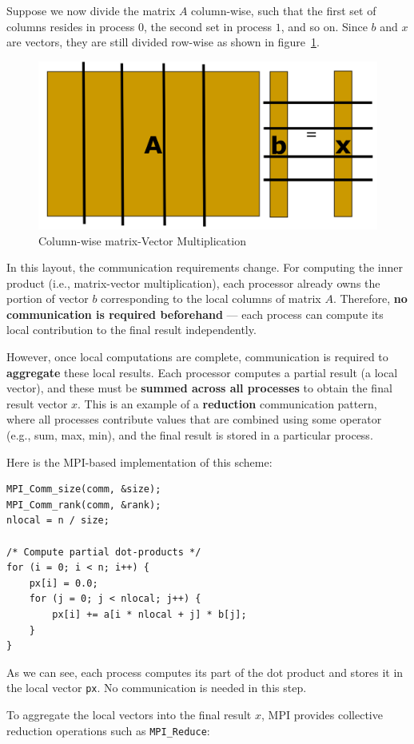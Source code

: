 \documentclass[12pt]{book}
\begin{document}
Suppose we now divide the matrix $A$ column-wise, such that the first set of columns resides in process $0$, the second set in process $1$, and so on. Since $b$ and $x$ are vectors, they are still divided row-wise as shown in figure~\ref{fig:column-wise}.
\begin{figure}[ht]
    \centering
    \includegraphics[width=0.5\linewidth]{images/Column-wise.png}
    \caption{Column-wise matrix-Vector Multiplication}
    \label{fig:column-wise}
\end{figure}
In this layout, the communication requirements change. For computing the inner product (i.e., matrix-vector multiplication), each processor already owns the portion of vector $b$ corresponding to the local columns of matrix $A$. Therefore, \textbf{no communication is required beforehand} — each process can compute its local contribution to the final result independently.

However, once local computations are complete, communication is required to \textbf{aggregate} these local results. Each processor computes a partial result (a local vector), and these must be \textbf{summed across all processes} to obtain the final result vector $x$. This is an example of a \textbf{reduction} communication pattern, where all processes contribute values that are combined using some operator (e.g., sum, max, min), and the final result is stored in a particular process.

Here is the MPI-based implementation of this scheme:
\begin{lstlisting}[style=cppstyle]
MPI_Comm_size(comm, &size);
MPI_Comm_rank(comm, &rank);
nlocal = n / size;

/* Compute partial dot-products */
for (i = 0; i < n; i++) {
    px[i] = 0.0;
    for (j = 0; j < nlocal; j++) {
        px[i] += a[i * nlocal + j] * b[j];
    }
}
\end{lstlisting}

As we can see, each process computes its part of the dot product and stores it in the local vector \texttt{px}. No communication is needed in this step.

To aggregate the local vectors into the final result $x$, MPI provides collective reduction operations such as \texttt{MPI\_Reduce}:
\end{document}
